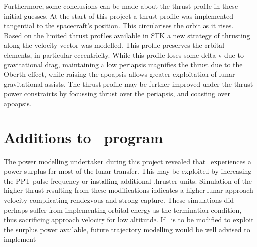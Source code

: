Furthermore, some conclusions can be made about the thrust profile in these initial guesses. At the start of this project a thrust profile was implemented tangential to the spacecraft's position. This circularises the orbit as it rises. Based on the limited thrust profiles available in STK a new strategy of thrusting along the velocity vector was modelled. This profile preserves the orbital elements, in particular eccentricity. While this profile loses some delta-v due to gravitational drag, maintaining a low periapsis magnifies the thrust due to the Oberth effect, while raising the apoapsis allows greater exploitation of lunar gravitational assists. The thrust profile may be further improved under the thrust power constraints by focussing thrust over the periapsis, and coasting over apoapsis.










\section{Additions to \BW\ program} \label{sec:BW1-additions}

The power modelling undertaken during this project revealed that \BW\ experiences a power surplus for most of the lunar transfer. This may be exploited by increasing the PPT pulse frequency or installing additional thruster units. Simulation of the higher thrust resulting from these modifications indicates a higher lunar approach velocity complicating rendezvous and strong capture. These simulations did perhaps suffer from implementing orbital energy as the termination condition, thus sacrificing approach velocity for low altitutde. If \BW\ is to be modified to exploit the surplus power available, future trajectory modelling would be well advised to implement 

